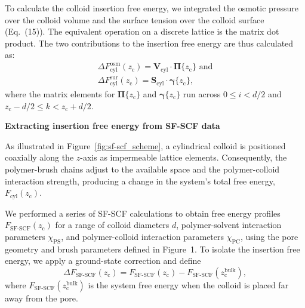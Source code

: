 \documentclass[10pt, a4paper, twocolumn]{article}
\begin{document}
To calculate the colloid insertion free energy, we integrated the osmotic pressure over the colloid volume and the surface tension over the colloid surface (Eq.~(15)).
The equivalent operation on a discrete lattice is the matrix dot product.
The two contributions to the insertion free energy are thus calculated as:
\begin{equation}
    \label{eq:cyl_fe_osm}
    \begin{split}
        \Delta F_{\text{cyl}}^{\text{osm}}(z_{\text{c}}) = \bm{V}_{\text{cyl}} \cdot \boldsymbol{\Pi}\{z_{\text{c}}\} \text{ and} \\
        \Delta F_{\text{cyl}}^{\text{sur}}(z_{\text{c}}) = \bm{S}_{\text{cyl}} \cdot \boldsymbol{\gamma}\{z_{\text{c}}\},
    \end{split}
\end{equation}
where the matrix elements for $\boldsymbol{\Pi}\{z_{\text{c}}\}$ and $\boldsymbol{\gamma}\{z_{\text{c}}\}$ run across $0 \leq i < d/2$ and $z_{\text{c}} - d/2 \leq k < z_{\text{c}} + d/2$.


\bigskip
\textbf{Extracting insertion free energy from SF-SCF data}

As illustrated in Figure~\ref{fig:sf-scf_scheme}, a cylindrical colloid is positioned coaxially along the $z$-axis as impermeable lattice elements.
Consequently, the polymer-brush chains adjust to the available space and the polymer-colloid interaction strength, producing a change in the system's total free energy, $F_{\text{cyl}}(z_{\text{c}})$.

We performed a series of SF-SCF calculations to obtain free energy profiles $F_{\text{SF-SCF}}(z_{\text{c}})$ for a range of colloid diameters $d$, polymer-solvent interaction parameters $\chi_{\text{PS}}$, and polymer-colloid interaction parameters $\chi_{\text{PC}}$, using the pore geometry and brush parameters defined in Figure~1.  
To isolate the insertion free energy, we apply a ground-state correction and define
\begin{equation}
    \Delta F_{\text{SF-SCF}}(z_{\text{c}}) 
    = F_{\text{SF-SCF}}(z_{\text{c}}) - F_{\text{SF-SCF}}(z_{\text{c}}^{\text{bulk}}),
\end{equation}
where $F_{\text{SF-SCF}}(z_{\text{c}}^{\text{bulk}})$ is the system free energy when the colloid is placed far away from the pore.%
\end{document}

